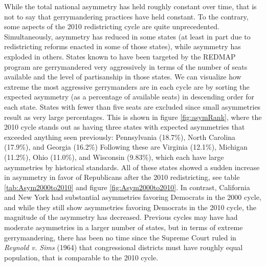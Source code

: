 \documentclass[preprint,12pt]{article}
\begin{document}
While the total national asymmetry has held roughly constant over time, that is not to say that gerrymandering practices have held constant.
To the contrary, some aspects of the 2010 redistricting cycle are quite unprecedented.
Simultaneously, asymmetry has reduced in some states (at least in part due to redistricting reforms enacted in some of those states), while asymmetry has exploded in others.
States known to have been targeted by the REDMAP program are gerrymandered very aggressively in terms of the number of seats available and the level of partisanship in those states.
We can visualize how extreme the most aggressive gerrymanders are in each cycle are by sorting the expected asymmetry (as a percentage of available seats) in descending order for each state.
States with fewer than five seats are excluded since small asymmetries result as very large percentages.
This is shown in figure \ref{fig:asymRank}, where the 2010 cycle stands out as having three states with expected asymmetries that exceeded anything seen previously: Pennsylvania (18.7\%), North Carolina (17.9\%), and Georgia (16.2\%)
Following these are Virginia (12.1\%), Michigan (11.2\%), Ohio (11.0\%), and Wisconsin (9.83\%), which each have large asymmetries by historical standards.
All of these states showed a sudden increase in asymmetry in favor of Republicans after the 2010 redistricting, see table \ref{tab:Asym2000to2010} and figure \ref{fig:Asym2000to2010}. 
In contrast, California and New York had substantial asymmetries favoring Democrats in the 2000 cycle, and while they still show asymmetries favoring Democrats in the 2010 cycle, the magnitude of the asymmetry has decreased.
Previous cycles may have had moderate asymmetries in a larger number of states, but in terms of extreme gerrymandering, there has been no time since the Supreme Court ruled in \emph{Reynold v. Sims} (1964) that congressional districts must have roughly equal population, that is comparable to the 2010 cycle.
\end{document}
